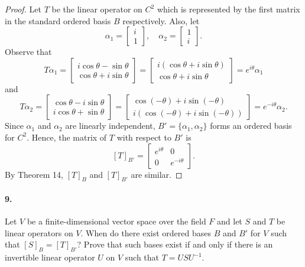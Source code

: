 \documentclass{article}
\begin{document}
\begin{proof}
  Let $T$ be the linear operator on $C^2$ which is represented by the first
  matrix in the standard ordered basis $B$ respectively. Also, let \[
    \alpha_1 = \begin{bmatrix}
      i \\ 1
    \end{bmatrix},\quad
    \alpha_2 = \begin{bmatrix}
      1 \\ i
    \end{bmatrix}.
  \] Observe that \[
    T\alpha_1 = \begin{bmatrix}
      i\cos\theta - \sin\theta \\ \cos\theta + i\sin\theta
    \end{bmatrix} = \begin{bmatrix}
      i(\cos\theta + i\sin\theta) \\ \cos\theta + i\sin\theta
    \end{bmatrix} = e^{i\theta}\alpha_1
  \] and \[
    T\alpha_2 = \begin{bmatrix}
      \cos\theta - i\sin\theta \\ i\cos\theta + \sin\theta
    \end{bmatrix} = \begin{bmatrix}
      \cos(-\theta) + i\sin(-\theta) \\ i(\cos(-\theta) + i\sin(-\theta))
    \end{bmatrix} = e^{-i\theta}\alpha_2.
  \] Since $\alpha_1$ and $\alpha_2$ are linearly independent, $B' = \{\alpha_1,
  \alpha_2\}$ forms an ordered basis for $C^2$. Hence, the matrix of $T$ with
  respect to $B'$ is \[
    [T]_{B'} = \begin{bmatrix}
      e^{i\theta} & 0 \\ 0 & e^{-i\theta}
    \end{bmatrix}.
  \] By Theorem 14, $[T]_B$ and $[T]_{B'}$ are similar.
\end{proof}

\paragraph{9.} Let $V$ be a finite-dimensional vector space over the field $F$
and let $S$ and $T$ be linear operators on $V$. When do there exist ordered
bases $B$ and $B'$ for $V$ such that $[S]_B = [T]_{B'}$? Prove that such bases
exist if and only if there is an invertible linear operator $U$ on $V$ such that
$T = USU^{-1}$.
\end{document}
